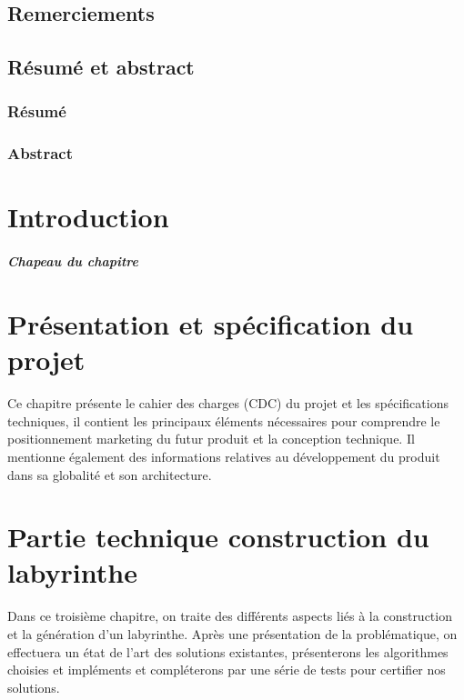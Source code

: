 \documentclass[12pt, french]{report}
\begin{document}

\clearpage

\thispagestyle{empty}
\section*{Remerciements}

\clearpage
\thispagestyle{empty}
\section*{Résumé et abstract}
\subsection*{Résumé}

\subsection*{Abstract}

\clearpage
\setcounter{page}{1}
\tableofcontents
\listoffigures

\clearpage

\chapter{Introduction}
\paragraph{Chapeau du chapitre}

\clearpage

\chapter{Présentation et spécification du projet}
Ce chapitre présente le cahier des charges (CDC) du projet et les
spécifications techniques, il contient les principaux éléments nécessaires
pour comprendre le positionnement marketing du futur produit et la
conception technique. Il mentionne également des informations relatives au
développement du produit dans sa globalité et son architecture.


\clearpage

\chapter{Partie technique construction du labyrinthe}
Dans ce troisième chapitre, on traite des différents aspects liés à la construction et la génération d'un labyrinthe.
Après une présentation de la problématique, on effectuera un état de l'art des solutions existantes, présenterons les algorithmes choisies et impléments et compléterons par une série de tests pour certifier nos solutions.

\clearpage
\end{document}
